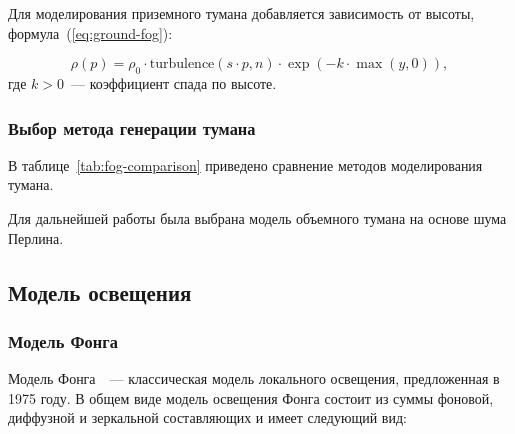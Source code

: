 Для моделирования приземного тумана добавляется зависимость от высоты, формула~(\ref{eq:ground-fog}):

\begin{equation}
    \label{eq:ground-fog}
    \rho(p) = \rho_0 \cdot \text{turbulence}(s \cdot p, n) \cdot \exp(-k \cdot \max(y, 0)),
\end{equation}
\noindent где $k > 0$~--- коэффициент спада по высоте.

\subsubsection{Выбор метода генерации тумана}
В таблице~\ref{tab:fog-comparison} приведено сравнение методов моделирования тумана.

\begin{table}[H]
\captionsetup{justification=raggedleft,singlelinecheck=false}
\caption{Сравнение методов моделирования тумана}
\label{tab:fog-comparison}
\end{table}

Для дальнейшей работы была выбрана модель объемного тумана на основе шума Перлина.


\subsection{Модель освещения}
\subsubsection{Модель Фонга}

Модель Фонга~\cite[с.~33]{lighting-models}~--- классическая модель локального освещения, предложенная в 1975 году.
В общем виде модель освещения Фонга состоит из суммы фоновой, диффузной и зеркальной составляющих и имеет следующий вид:

